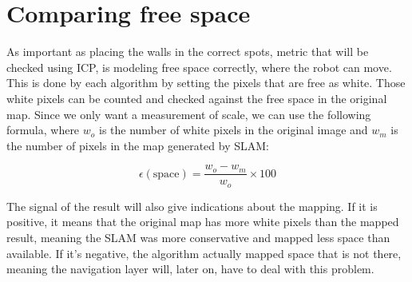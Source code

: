 \section{Comparing free space} \label{sec:free_space}

As important as placing the walls in the correct spots, metric that will be checked using ICP, is modeling free space correctly, where the robot can move. This is done by each algorithm by setting the pixels that are free as white. Those white pixels can be counted and checked against the free space in the original map. Since we only want a measurement of scale, we can use the following formula, where $w_o$ is the number of white pixels in the original image and $w_m$ is the number of pixels in the map generated by SLAM:

\begin{equation}
\epsilon(\text{space}) = \frac{w_o - w_m}{w_o} \times 100
\end{equation}

The signal of the result will also give indications about the mapping. If it is positive, it means that the original map has more white pixels than the mapped result, meaning the SLAM was more conservative and mapped less space than available. If it's negative, the algorithm actually mapped space that is not there, meaning the navigation layer will, later on, have to deal with this problem.
